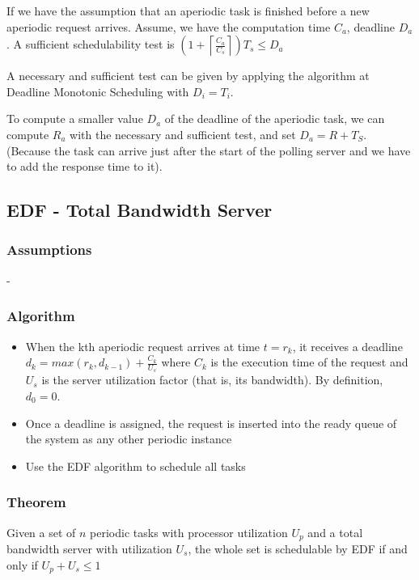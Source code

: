 \begin{theorem}
If we have the assumption that an aperiodic task is finished before a new 
aperiodic request arrives. Assume, we have the computation time $C_a$, deadline $D_a$.
A sufficient schedulability test is
$( 1+ \left \lceil{\frac{C_a}{C_s}}\right \rceil  )T_s \leq D_a$


\begin{theorem}
A necessary and sufficient test can be given by applying the algorithm at Deadline Monotonic Scheduling with $D_i = T_i$.
\end{theorem}


\begin{tnote}
To compute a smaller value $D_a$ of the deadline of the aperiodic task, we can compute $R_a$ with the necessary and sufficient test, and set $D_a = R + T_S$. (Because the task can arrive just after the start of the polling server and we have to add the response time to it).
\end{tnote}

\subsection{EDF - Total Bandwidth Server}

\subsubsection{Assumptions}
-

\subsubsection{Algorithm}
\begin{itemize}[noitemsep]
\item When the kth aperiodic request arrives at time $t = r_k$, it receives 
a deadline
$d_k = max( r_k, d_{k-1}) + \frac{C_k}{U_s}$
where $C_k$ is the execution time of the request and $U_s$ is the 
server utilization factor (that is, its bandwidth). By definition, $d_0 = 0$.

\item Once a deadline is assigned, the request is inserted into the 
ready queue of the system as any other periodic instance
\item Use the EDF algorithm to schedule all tasks
\end{itemize}



\subsubsection{Theorem}
\begin{theorem}
Given a set of $n$ periodic tasks with processor utilization $U_p$ and a total bandwidth server with utilization 
$U_s$, the whole set is schedulable by EDF if and only if $U_p + U_s \leq 1$
\end{theorem}


\end{theorem}

\cleardoublepage